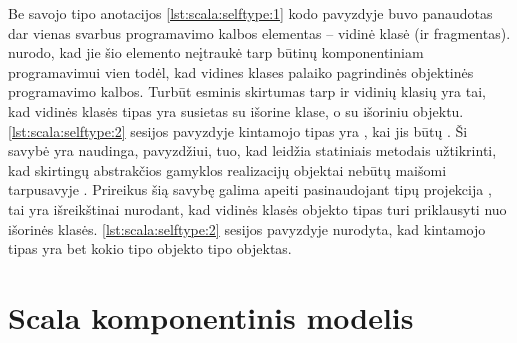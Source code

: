 \begin{scalacodelisting}
  \label{lst:scala:selftype:1}
\end{scalacodelisting}

\begin{scalainterpreterlisting}
  \label{lst:scala:selftype:2}
\end{scalainterpreterlisting}

Be savojo tipo anotacijos \ref{lst:scala:selftype:1} kodo pavyzdyje buvo
panaudotas dar vienas svarbus programavimo kalbos elementas – vidinė
klasė (ir fragmentas). \cite[12]{scalable-component-abstractions}
nurodo, kad jie šio elemento neįtraukė tarp būtinų komponentiniam
programavimui vien todėl, kad vidines klases palaiko pagrindinės
 objektinės programavimo kalbos. Turbūt esminis
skirtumas tarp  ir  vidinių klasių
yra tai, kad  vidinės klasės tipas yra susietas su
išorine klase, o  su išoriniu objektu.
\ref{lst:scala:selftype:2}  sesijos pavyzdyje kintamojo
 tipas yra , kai  jis
būtų . Ši savybė yra naudinga, pavyzdžiui, tuo, kad 
leidžia statiniais metodais užtikrinti, kad skirtingų abstrakčios
gamyklos  realizacijų objektai nebūtų maišomi
tarpusavyje \cite[36]{scala-design-patterns}. Prireikus šią savybę
galima apeiti pasinaudojant tipų projekcija ,
tai yra išreikštinai nurodant, kad vidinės klasės objekto tipas
turi priklausyti nuo išorinės klasės. \ref{lst:scala:selftype:2}
sesijos pavyzdyje nurodyta, kad kintamojo  tipas yra
bet kokio  tipo objekto  tipo objektas.

\section{Scala komponentinis modelis}

